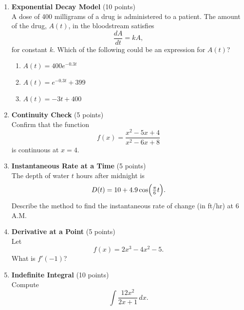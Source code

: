 \begin{enumerate}
  \item \textbf{Exponential Decay Model} (10 points)\\
  A dose of 400 milligrams of a drug is administered to a patient. The amount of the drug, $A(t)$, in the bloodstream satisfies
  \[
    \frac{dA}{dt} = k A,
  \]
  for constant $k$. Which of the following could be an expression for $A(t)$?\\
  \begin{enumerate}[label=(\Alph*)]
    \item $A(t) = 400 e^{-0.3t}$
    \item $A(t) = e^{-0.3t} + 399$
    \item $A(t) = -3t + 400$
  \end{enumerate}
  \begin{subanswer}
  \end{subanswer}

  \item \textbf{Continuity Check} (5 points)\\
  Confirm that the function
  \[
    f(x) = \frac{x^2 - 5x + 4}{x^2 - 6x + 8}
  \]
  is continuous at $x = 4$.  
  \begin{subanswer}
  \end{subanswer}

  \item \textbf{Instantaneous Rate at a Time} (5 points)\\
  The depth of water $t$ hours after midnight is
  \[
    D(t) = 10 + 4.9 \cos\Bigl(\tfrac{\pi}{6} t\Bigr).
  \]
  Describe the method to find the instantaneous rate of change (in ft/hr) at 6 A.M.
  \begin{subanswer}
  \end{subanswer}

  \item \textbf{Derivative at a Point} (5 points)\\
  Let
  \[
    f(x) = 2x^3 - 4x^2 - 5.
  \]
  What is $f'(-1)$?
  \begin{subanswer}
  \end{subanswer}

  \item \textbf{Indefinite Integral} (10 points)\\
  Compute
  \[
    \int \frac{12 x^2}{2x + 1} \,dx.
  \]
  \begin{subanswer}
  \end{subanswer}


\end{enumerate}
